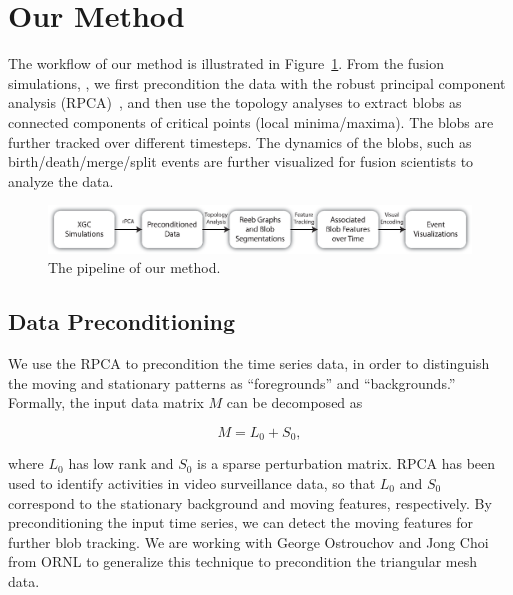 \section{Our Method}
\label{sec:method}

The workflow of our method is illustrated in Figure~\ref{fig:pipeline}.  
From the fusion simulations, , we first precondition the data with the robust principal component analysis (RPCA)~\cite{CandesLMW11}, and then use the topology analyses to extract blobs as connected components of critical points (local minima/maxima).  The blobs are further tracked over different timesteps.  The dynamics of the blobs, such as birth/death/merge/split events are further visualized for fusion scientists to analyze the data.  



\begin{figure}[!h]
  \centering
  \includegraphics[width=\linewidth]{Figs/pipeline}
  \caption{The pipeline of our method.}
  \label{fig:pipeline}
\end{figure}


\subsection{Data Preconditioning}

We use the RPCA to precondition the time series data, in order to distinguish the moving and stationary patterns as ``foregrounds'' and ``backgrounds.''  Formally, the input data matrix $M$ can be decomposed as 

\begin{equation}
M = L_0 + S_0, 
\end{equation}

\noindent where $L_0$ has low rank and $S_0$ is a sparse perturbation matrix.  RPCA has been used to identify activities in video surveillance data, so that $L_0$ and $S_0$ correspond to the stationary background and moving features, respectively.  By preconditioning the input time series, we can detect the moving features for further blob tracking.  We are working with George Ostrouchov and Jong Choi from ORNL to generalize this technique to precondition the triangular mesh data.  


